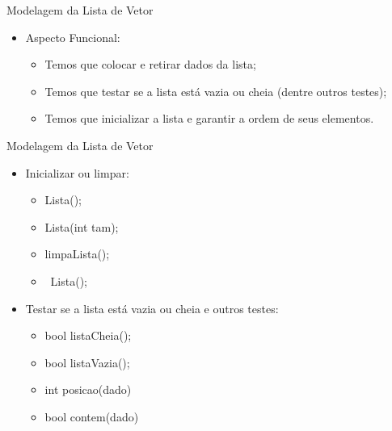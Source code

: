 \documentclass[12pt,table,xcolor={dvipsnames}]{beamer}
\begin{document}
\begin{frame}[fragile]{Modelagem da Lista de Vetor}

\begin{itemize}
\item Aspecto Funcional:
\begin{itemize}
\item Temos que colocar e retirar dados da lista;
\item Temos que testar se a lista está vazia ou cheia (dentre outros testes);
\item Temos que inicializar a lista e garantir a ordem de seus elementos.
\end{itemize}
\end{itemize}
\end{frame}

\begin{frame}[fragile]{Modelagem da Lista de Vetor}

\begin{itemize}
\item Inicializar ou limpar:
\begin{itemize}
\item Lista();
\item Lista(int tam);
\item limpaLista();
\item ~Lista();
\end{itemize}
\item Testar se a lista está vazia ou cheia e outros testes:
\begin{itemize}
\item bool listaCheia();
\item bool listaVazia();
\item int posicao(dado)
\item bool contem(dado)
\end{itemize}
\end{itemize}
\end{frame}
\end{document}
